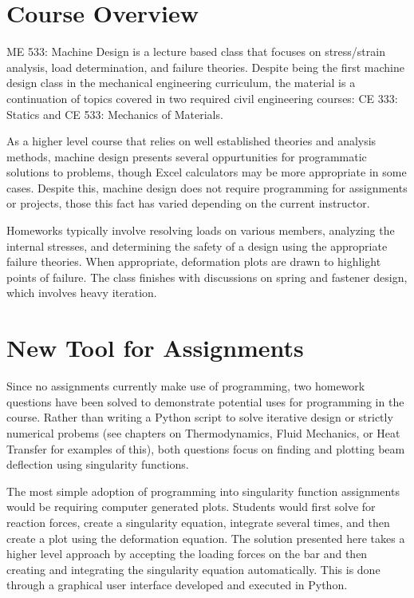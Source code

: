 \section{Course Overview}

ME 533: Machine Design is a lecture based class that focuses on stress/strain analysis, load determination,
and failure theories. Despite being the first machine design class in the mechanical engineering curriculum, 
the material is a continuation of topics covered in two required civil engineering courses: CE 333: Statics
and CE 533: Mechanics of Materials.

As a higher level course that relies on well established theories and analysis methods, machine design
presents several oppurtunities for programmatic solutions to problems, though Excel calculators may
be more appropriate in some cases. Despite this, machine design does not require programming for 
assignments or projects, those this fact has varied depending on the current instructor. 

Homeworks typically involve resolving loads on various members, analyzing the internal stresses, and 
determining the safety of a design using the appropriate failure theories. When appropriate, deformation
plots are drawn to highlight points of failure. The class finishes with discussions on spring and fastener
design, which involves heavy iteration.

\section{New Tool for Assignments}

Since no assignments currently make use of programming, two homework questions have been solved to demonstrate
potential uses for programming in the course. Rather than writing a Python script to solve iterative design or
strictly numerical probems (see chapters on Thermodynamics, Fluid Mechanics, or Heat Transfer for examples of
this), both questions focus on finding and plotting beam deflection using singularity functions. 

The most simple adoption of programming into singularity function assignments would be requiring computer
generated plots. Students would first solve for reaction forces, create a singularity equation, integrate
several times, and then create a plot using the deformation equation. The solution presented here takes a 
higher level approach by accepting the loading forces on the bar and then creating and integrating the 
singularity equation automatically. This is done through a graphical user interface developed and executed
in Python.

